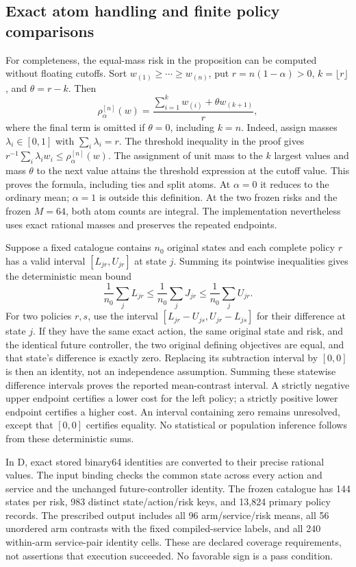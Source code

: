 \subsection{Exact atom handling and finite policy comparisons}
For completeness, the equal-mass risk in the proposition can be computed
without floating cutoffs.  Sort $w_{(1)}\ge\cdots\ge w_{(n)}$,
put $r=n(1-\alpha)>0$, $k=\lfloor r\rfloor$, and
$\theta=r-k$.  Then
\begin{equation}\label{eq:independentatoms119}
 \rho_\alpha^{[n]}(w)
 =\frac{\displaystyle\sum_{i=1}^k w_{(i)}
                  +\theta w_{(k+1)}}{r},
\end{equation}
where the final term is omitted if $\theta=0$, including $k=n$.
Indeed, assign masses $\lambda_i\in[0,1]$ with
$\sum_i\lambda_i=r$.  The threshold inequality in the proof gives
$r^{-1}\sum_i\lambda_iw_i\le\rho_\alpha^{[n]}(w)$.
The assignment of unit mass to the $k$ largest values and mass
$\theta$ to the next value attains the threshold expression at the
cutoff value.  This proves the formula, including ties and split atoms.
At $\alpha=0$ it reduces to the ordinary mean; $\alpha=1$ is
outside this definition.  At the two frozen risks and the frozen
$M=64$, both atom counts are integral.  The implementation nevertheless
uses exact rational masses and preserves the repeated endpoints.

Suppose a fixed catalogue contains $n_0$ original states and each complete
policy $r$ has a valid interval $[L_{jr},U_{jr}]$ at state $j$.
Summing its pointwise inequalities gives the deterministic mean bound
\[
 \frac1{n_0}\sum_jL_{jr}
 \le\frac1{n_0}\sum_jJ_{jr}
 \le\frac1{n_0}\sum_jU_{jr}.
\]
For two policies $r,s$, use the interval
$[L_{jr}-U_{js},U_{jr}-L_{js}]$ for their difference at state $j$.
If they have the same exact action, the same original state and risk,
and the identical future controller, the two original defining objectives
are equal, and that state's difference is exactly zero.  Replacing its
subtraction interval by $[0,0]$ is then an identity, not an independence
assumption.  Summing these statewise difference intervals proves the
reported mean-contrast interval.  A strictly negative upper endpoint
certifies a lower cost for the left policy; a strictly positive lower
endpoint certifies a higher cost.  An interval containing zero remains
unresolved, except that $[0,0]$ certifies equality.  No statistical or
population inference follows from these deterministic sums.

In D, exact stored binary64 identities are converted to their precise
rational values.  The input binding checks the common state across every
action and service and the unchanged future-controller identity.  The
frozen catalogue has 144 states per risk, 983 distinct state/action/risk
keys, and 13,824 primary policy records.  The prescribed output includes
all 96 arm/service/risk means, all 56 unordered arm contrasts with the
fixed compiled-service labels, and all 240 within-arm service-pair
identity cells.  These are declared coverage requirements, not assertions
that execution succeeded.  No favorable sign is a pass condition.

